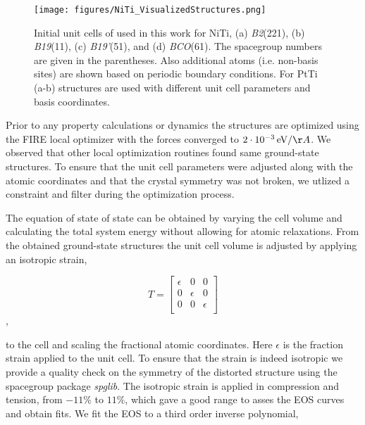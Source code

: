 \documentclass[preprint]{elsarticle}
\begin{document}
\begin{figure}[ht!]
    \begin{centering}
        \texttt{[image: figures/NiTi\_VisualizedStructures.png]}
        \caption{
          Initial unit cells of used in this work for NiTi, (a) \textit{B2}(221), (b) \textit{B19}(11), (c) \textit{B19'}(51), and (d) \textit{BCO}(61). The spacegroup numbers are given in the parentheses. Also additional atoms (i.e. non-basis sites) are shown based on periodic boundary conditions. For PtTi (a-b) structures are used with different unit cell parameters and basis coordinates. 
        }
        \label{fig:niti_structures}
    \end{centering}
\end{figure}

Prior to any property calculations or dynamics the structures are optimized using the FIRE\cite{Bitzek2006} local optimizer with the forces converged to $2\cdot 10^{-3}\,\text{eV}/\AA$. We observed that other local optimization routines found same ground-state structures. To ensure that the unit cell parameters were adjusted along with the atomic coordinates and that the crystal symmetry was not broken, we utlized a constraint and filter during the optimization process. \par

The equation of state of state can be obtained by varying the cell volume and calculating the total system energy without allowing for atomic relaxations. From the obtained ground-state structures the unit cell volume is adjusted by applying an isotropic strain,

\begin{equation}
  \label{eq:isotropic_strain}
  T=\begin{bmatrix}
    \epsilon & 0 & 0 \\
    0 & \epsilon & 0 \\
    0 & 0 & \epsilon \\
  \end{bmatrix}
\end{equation},

to the cell and scaling the fractional atomic coordinates. Here $\epsilon$ is the fraction strain applied to the unit cell. To ensure that the strain is indeed isotropic we provide a quality check on the symmetry of the distorted structure using the spacegroup package \textit{spglib}.\cite{Togo2018} The isotropic strain is applied in compression and tension, from $-11\%$ to $11\%$, which gave a good range to asses the EOS curves and obtain fits. We fit the EOS to a third order inverse polynomial,
\end{document}
